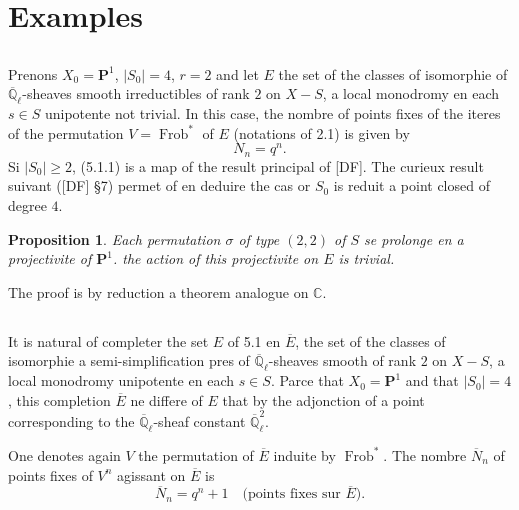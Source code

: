 \documentclass[11pt,a4paper]{article}
\theoremstyle{plain}
\newtheorem{proposition}[theorem]{Proposition}
\theoremstyle{definition}
\DeclareMathOperator{\Frob}{Frob}
\newcommand{\C}{\mathbb{C}}
\newcommand{\Ql}{\overline{\mathbb{Q}}_\ell}
\begin{document}
\section{Examples}

\subsection{}
Prenons $X_0 = \mathbf{P}^1$, $|S_0| = 4$, $r = 2$ and let $E$ the set of the classes of isomorphie of $\Ql$-sheaves smooth irreductibles of rank $2$ on $X - S$, a local monodromy en each $s \in S$ unipotente not trivial. In this case, the nombre of points fixes of the iteres of the permutation $V = \Frob^*$ of $E$ (notations of 2.1) is given by
\begin{equation}
N_n = q^n.
\tag{5.1.1}
\end{equation}
Si $|S_0| \geq 2$, (5.1.1) is a map of the result principal of [DF]. The curieux result suivant ([DF] \S 7) permet of en deduire the cas or $S_0$ is reduit a point closed of degree $4$.

\begin{proposition}
Each permutation $\sigma$ of type $(2, 2)$ of $S$ se prolonge en a projectivite of $\mathbf{P}^1$. the action of this projectivite on $E$ is trivial.
\end{proposition}

The proof is by reduction a theorem analogue on $\C$.

\subsection{}
It is natural of completer the set $E$ of 5.1 en $\overline{E}$, the set of the classes of isomorphie a semi-simplification pres of $\Ql$-sheaves smooth of rank $2$ on $X - S$, a local monodromy unipotente en each $s \in S$. Parce that $X_0 = \mathbf{P}^1$ and that $|S_0| = 4$, this completion $\overline{E}$ ne differe of $E$ that by the adjonction of a point corresponding to the $\Ql$-sheaf constant $\Ql^2$.

One denotes again $V$ the permutation of $\overline{E}$ induite by $\Frob^*$. The nombre $\overline{N}_n$ of points fixes of $V^n$ agissant on $\overline{E}$ is
\begin{equation}
\overline{N}_n = q^n + 1 \quad \text{(points fixes sur } \overline{E}).
\tag{5.3.1}
\end{equation}
\end{document}
